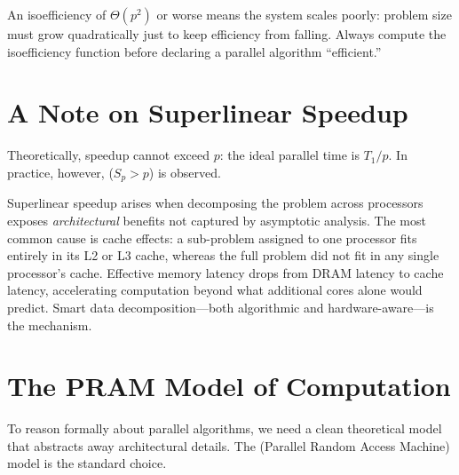 \begin{pppitfall}
An isoefficiency of $\Theta(p^2)$ or worse means the system scales poorly:
problem size must grow quadratically just to keep efficiency from falling.
Always compute the isoefficiency function before declaring a parallel
algorithm ``efficient.''
\end{pppitfall}

\section{A Note on Superlinear Speedup}

Theoretically, speedup cannot exceed $p$: the ideal parallel time is $T_1/p$.
In practice, however,  ($S_p > p$) is observed.

\begin{ppnote}
Superlinear speedup arises when decomposing the problem across processors
exposes \emph{architectural} benefits not captured by asymptotic analysis.
The most common cause is cache effects: a sub-problem assigned to one
processor fits entirely in its L2 or L3 cache, whereas the full problem did
not fit in any single processor's cache. Effective memory latency drops from
DRAM latency to cache latency, accelerating computation beyond what additional
cores alone would predict. Smart data decomposition---both algorithmic and
hardware-aware---is the mechanism.
\end{ppnote}

\section{The PRAM Model of Computation}

To reason formally about parallel algorithms, we need a clean theoretical
model that abstracts away architectural details. The 
(Parallel Random Access Machine) model is the standard choice.

